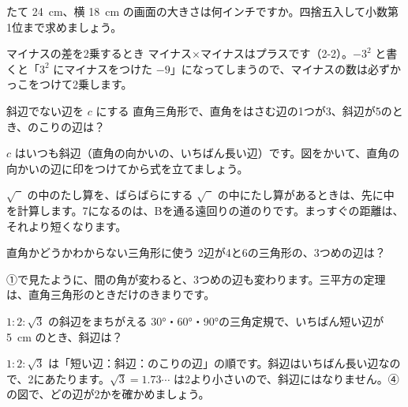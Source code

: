 \begin{jibun}
たて \qty{24}{cm}、横 \qty{18}{cm} の画面の大きさは何インチですか。四捨五入して小数第1位まで求めましょう。
\end{jibun}


\begin{tsumazuki}{マイナスの差を2乗するとき}
マイナス×マイナスはプラスです（2-2）。$-3^2$ と書くと「$3^2$ にマイナスをつけた $-9$」になってしまうので、マイナスの数は必ずかっこをつけて2乗します。
\end{tsumazuki}

\begin{tsumazuki}{斜辺でない辺を $c$ にする}
直角三角形で、直角をはさむ辺の1つが3、斜辺が5のとき、のこりの辺は？\par
{}
$c$ はいつも斜辺（直角の向かいの、いちばん長い辺）です。図をかいて、直角の向かいの辺に印をつけてから式を立てましょう。
\end{tsumazuki}

\begin{tsumazuki}{$\sqrt{\phantom{2}}$ の中のたし算を、ばらばらにする}
$\sqrt{\phantom{2}}$ の中にたし算があるときは、先に中を計算します。7になるのは、Bを通る遠回りの道のりです。まっすぐの距離は、それより短くなります。
\end{tsumazuki}

\begin{tsumazuki}{直角かどうかわからない三角形に使う}
2辺が4と6の三角形の、3つめの辺は？\par
{}
①で見たように、間の角が変わると、3つめの辺も変わります。三平方の定理は、直角三角形のときだけのきまりです。
\end{tsumazuki}

\begin{tsumazuki}{$1:2:\sqrt3$ の斜辺をまちがえる}
30°・60°・90°の三角定規で、いちばん短い辺が \qty{5}{cm} のとき、斜辺は？\par
{}
$1:2:\sqrt3$ は「短い辺：斜辺：のこりの辺」の順です。斜辺はいちばん長い辺なので、2にあたります。$\sqrt3=1.73\cdots$ は2より小さいので、斜辺にはなりません。④の図で、どの辺が2かを確かめましょう。
\end{tsumazuki}

